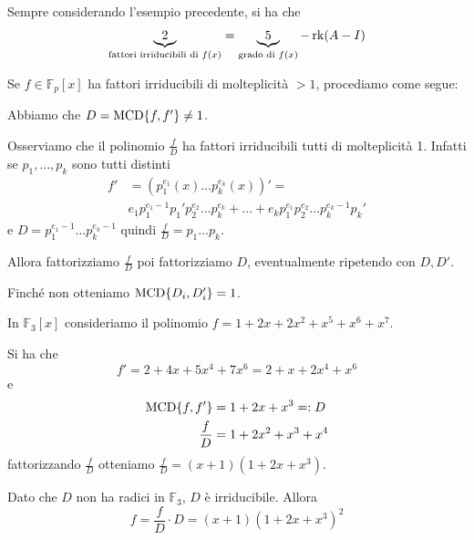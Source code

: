 \documentclass[../main.tex]{subfiles}
\begin{document}
\begin{example}
    Sempre considerando l'esempio precedente, si ha che
    \begin{equation*}
        \underbrace{2}_{\text{fattori irriducibili di $f(x)$}} = \underbrace{5}_{\text{grado di $f(x)$}} - \operatorname{rk}(A - I)
    \end{equation*}
\end{example}

Se $f \in \mathbb{F}_p[x]$ ha fattori irriducibili di molteplicità $> 1$, procediamo come segue:

Abbiamo che $D = \operatorname{MCD}\{f, f'\} \neq 1$.

Osserviamo che il polinomio $\frac{f}{D}$ ha fattori irriducibili tutti di molteplicità 1. Infatti se $p_1, \ldots , p_k$ sono tutti distinti
\begin{align*}
    f' & = (p_1^{e_1}(x) \ldots p_k^{e_k}(x))' =                                                                     \\
       & e_1 p_1^{e_1 - 1} p_1'p_2^{e_2} \ldots p_k^{e_k} + \ldots + e_k p_1^{e_1}p_2^{e_2} \ldots p_k^{e_k - 1}p_k'
\end{align*}
e $D = p_1^{e_1 - 1} \ldots p_k^{e_k - 1}$ quindi $\frac{f}{D} = p_1 \ldots p_k$.

Allora fattorizziamo $\frac{f}{D}$ poi fattorizziamo $D$, eventualmente ripetendo con $D, D'$.

Finché non otteniamo $\operatorname{MCD}\{ D_i, D_i'\} = 1$.

\begin{example}
    In $\mathbb{F}_3[x]$ consideriamo il polinomio $f = 1 + 2x + 2x^2 + x^5 + x^6 + x^7$.

    Si ha che
    \begin{equation*}
        f' = 2 + 4x + 5x^4 + 7x^6 = 2 + x + 2x^4 + x^6
    \end{equation*}
    e
    \begin{align*}
        \operatorname{MCD}\{f, f'\} & = 1 + 2x + x^3 =: D    \\
        \frac{f}{D}   & = 1 + 2x^2 + x^3 + x^4
    \end{align*}
    fattorizzando $\frac{f}{D}$ otteniamo $\frac{f}{D} = (x + 1)(1 + 2x+x^3)$.

    Dato che $D$ non ha radici in $\mathbb{F}_3$, $D$ è irriducibile. Allora
    \begin{equation*}
        f = \frac{f}{D} \cdot D = (x + 1)(1 + 2x + x^3)^2
    \end{equation*}
\end{example}
\end{document}

